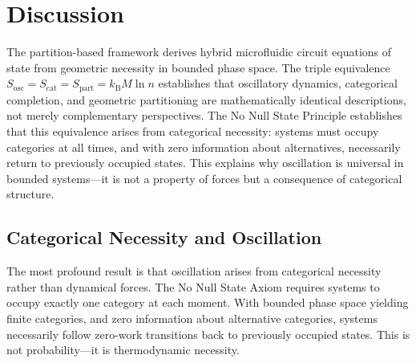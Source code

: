 \documentclass[12pt,a4paper]{article}
\theoremstyle{plain}
\theoremstyle{definition}
\theoremstyle{remark}
\newcommand{\kB}{k_{\mathrm{B}}}
\newcommand{\Sosc}{S_{\mathrm{osc}}}
\newcommand{\Scat}{S_{\mathrm{cat}}}
\newcommand{\Spart}{S_{\mathrm{part}}}
\begin{document}
























\section{Discussion}
\label{sec:discussion}

The partition-based framework derives hybrid microfluidic circuit equations of state from geometric necessity in bounded phase space. The triple equivalence $\Sosc = \Scat = \Spart = \kB M \ln n$ establishes that oscillatory dynamics, categorical completion, and geometric partitioning are mathematically identical descriptions, not merely complementary perspectives. The No Null State Principle establishes that this equivalence arises from categorical necessity: systems must occupy categories at all times, and with zero information about alternatives, necessarily return to previously occupied states. This explains why oscillation is universal in bounded systems—it is not a property of forces but a consequence of categorical structure.

\subsection{Categorical Necessity and Oscillation}

The most profound result is that oscillation arises from categorical necessity rather than dynamical forces. The No Null State Axiom requires systems to occupy exactly one category at each moment. With bounded phase space yielding finite categories, and zero information about alternative categories, systems necessarily follow zero-work transitions back to previously occupied states. This is not probability—it is thermodynamic necessity.
\end{document}
